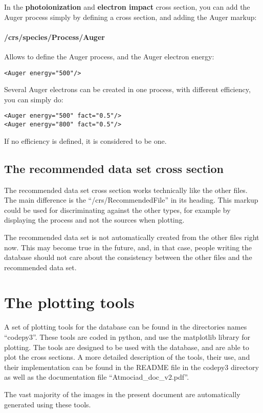 In the \textbf{photoionization} and \textbf{electron impact} cross section, you can add the Auger process simply by defining a cross section, and adding the Auger markup:

\paragraph{/crs/species/Process/Auger}
Allows to define the Auger process, and the Auger electron energy:
\begin{verbatim}
<Auger energy="500"/>
\end{verbatim}


Several Auger electrons can be created in one process, with different efficiency, you can simply do:

\begin{verbatim}
<Auger energy="500" fact="0.5"/>
<Auger energy="800" fact="0.5"/>
\end{verbatim}

If no efficiency is defined, it is considered to be one.


\subsection{The recommended data set cross section}

The recommended data set cross section works technically like the other files.
The main difference is the ``/crs/RecommendedFile'' in its heading.
This markup could be used for discriminating against the other types, for example by displaying the process and 
not the sources when plotting. 

The recommended data set is not automatically created from the other files right now. This may become true in the future, and, in that case, people writing the database should not care about the consistency between the other files and the recommended data set.



\section{The plotting tools}
\label{autoplottingsystem}
A set of plotting tools for the database can be found in the directories names ``codepy3''. These tools are coded in python, and use the matplotlib library for plotting. The tools are designed to be used with the database, and are able to plot the cross sections.
A more detailed description of the tools, their use, and their implementation can be found in the README file in the codepy3 directory as well as the documentation file ``Atmociad\_doc\_v2.pdf''.

The vast majority of the images in the present document are automatically generated using these tools.










